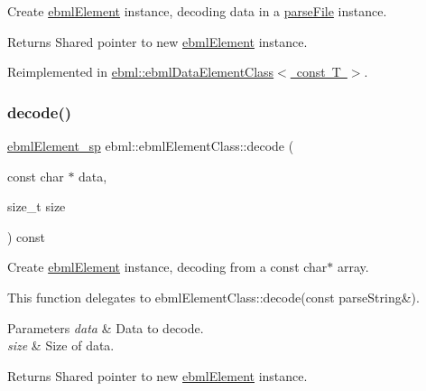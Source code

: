 Create \mbox{\hyperlink{classebml_1_1ebmlElement}{ebml\+Element}} instance, decoding data in a \mbox{\hyperlink{classebml_1_1parseFile}{parse\+File}} instance.

\begin{DoxyReturn}{Returns}
Shared pointer to new \mbox{\hyperlink{classebml_1_1ebmlElement}{ebml\+Element}} instance. 
\end{DoxyReturn}


Reimplemented in \mbox{\hyperlink{classebml_1_1ebmlDataElementClass_3_01const_01T_01_4_a8e55ca5bba1f4406920f75cd9b0e9bbc}{ebml\+::ebml\+Data\+Element\+Class$<$ const T $>$}}.

\mbox{\label{classebml_1_1ebmlElementClass_ac24711e997db80f691a8bff4f610242f}} 
\subsubsection{\texorpdfstring{decode()}{decode()}\hspace{0.1cm}{\footnotesize\ttfamily [3/6]}}
{\footnotesize\ttfamily \mbox{\hyperlink{namespaceebml_adad533b7705a16bb360fe56380c5e7be}{ebml\+Element\+\_\+sp}} ebml\+::ebml\+Element\+Class\+::decode (\begin{DoxyParamCaption}\item[{const char $\ast$}]{data,  }\item[{size\+\_\+t}]{size }\end{DoxyParamCaption}) const}

Create \mbox{\hyperlink{classebml_1_1ebmlElement}{ebml\+Element}} instance, decoding from a const char$\ast$ array.

This function delegates to ebml\+Element\+Class\+::decode(const parse\+String\&).


\begin{DoxyParams}{Parameters}
{\em data} & Data to decode. \\
\hline
{\em size} & Size of \textquotesingle{}data\textquotesingle{}. \\
\hline
\end{DoxyParams}
\begin{DoxyReturn}{Returns}
Shared pointer to new \mbox{\hyperlink{classebml_1_1ebmlElement}{ebml\+Element}} instance. 
\end{DoxyReturn}

